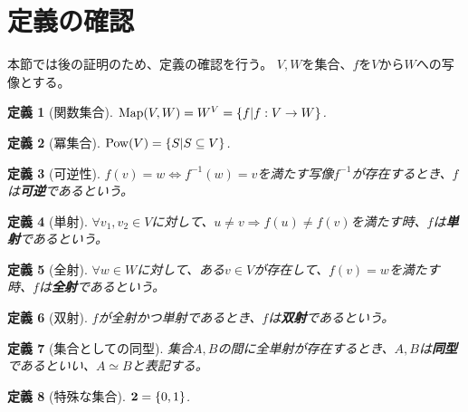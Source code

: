 \documentclass{jsarticle}
\newtheorem{Definition}{定義}
\newcommand{\Pow}{ {\rm Pow} }
\newcommand{\Map}{ {\rm Map} }
\newcommand{\2}{ {\bf 2} }
\begin{document}
    \section{定義の確認}
    本節では後の証明のため、定義の確認を行う。
    $V,W$を集合、$f$を$V$から$W$への写像とする。
    \begin{Definition}[関数集合]
        $\Map(V,W) = W^V = \{f | f:V \rightarrow W\}$.
    \end{Definition}
    
    \begin{Definition}[冪集合]
        $\Pow(V) = \{S | S \subseteq V \}$.
    \end{Definition}
    
    \begin{Definition}[可逆性]
        $f(v)=w \Leftrightarrow f^{-1}(w)=v$を満たす写像$f^{-1}$が存在するとき、$f$は{\bf 可逆}であるという。
    \end{Definition}
    
    \begin{Definition}[単射]
        $\forall v_1,v_2 \in V$に対して、$u \neq v \Rightarrow f(u) \neq f(v)$を満たす時、$f$は{\bf 単射}であるという。
    \end{Definition}
    
    \begin{Definition}[全射]
        $\forall w \in W$に対して、ある$v \in V$が存在して、$f(v)=w$を満たす時、$f$は{\bf 全射}であるという。
    \end{Definition}
    
    \begin{Definition}[双射]
        $f$が全射かつ単射であるとき、$f$は{\bf 双射}であるという。
    \end{Definition}
    
    \begin{Definition}[集合としての同型]
        集合$A,B$の間に全単射が存在するとき、$A,B$は{\bf 同型}であるといい、$A \simeq B$と表記する。
    \end{Definition}
    
    \begin{Definition}[特殊な集合]
        $\2 = \{0,1\}$.
    \end{Definition}
    
\end{document}
